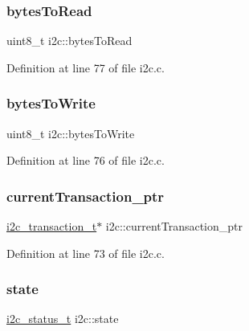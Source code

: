 \mbox{\label{structi2c_aa54fb1d1cfe0f585428f67a2f89be938}} 
\subsubsection{\texorpdfstring{bytesToRead}{bytesToRead}}
{\footnotesize\ttfamily uint8\+\_\+t i2c\+::bytes\+To\+Read}



Definition at line 77 of file i2c.\+c.

\mbox{\label{structi2c_a4202aea4cdb53f01f8cef8562d4f2d65}} 
\subsubsection{\texorpdfstring{bytesToWrite}{bytesToWrite}}
{\footnotesize\ttfamily uint8\+\_\+t i2c\+::bytes\+To\+Write}



Definition at line 76 of file i2c.\+c.

\mbox{\label{structi2c_afca76c325a94a33dc4bb4e6a28b35fcf}} 
\subsubsection{\texorpdfstring{currentTransaction\_ptr}{currentTransaction\_ptr}}
{\footnotesize\ttfamily \mbox{\hyperlink{i2c_8h_a8b9b6c6a900b8e4a9ca7c41f6cf1d6fa}{i2c\+\_\+transaction\+\_\+t}}$\ast$ i2c\+::current\+Transaction\+\_\+ptr}



Definition at line 73 of file i2c.\+c.

\mbox{\label{structi2c_a34d072b4e51269fe40e4ebe4e5de01ee}} 
\subsubsection{\texorpdfstring{state}{state}}
{\footnotesize\ttfamily \mbox{\hyperlink{i2c_8c_ada1e8e589688e2d6626421d8d85d9c53}{i2c\+\_\+status\+\_\+t}} i2c\+::state}



